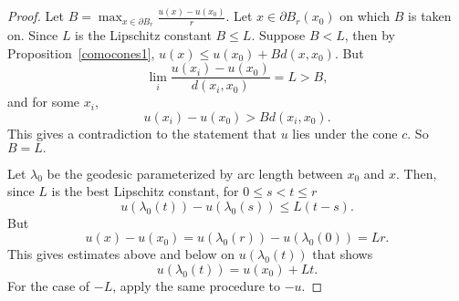 \documentclass{ip-journal}
\theoremstyle{definition}
\numberwithin{equation}{section}
\begin{document}
\begin{proof} Let $B = \max_{x \in \partial B_r} \frac{u(x)- u(x_0)}{r}.$  Let $x \in \partial B_r(x_0)$ on which $B$ is taken on.  Since $L$ is the  Lipschitz constant $B \leq L.$
Suppose $B < L$, then  by Proposition~\ref{comocones1}, $u (x) \leq u(x_0) +Bd(x,x_0)$. But 
\[
\lim_i \frac{u(x_i) - u(x_0)}{d(x_i,x_0)} = L > B,
\] 
and for some $x_i$,
\[ 
u(x_i) - u(x_0) > Bd(x_i,x_0).
\] 
This gives a contradiction to the statement that $u$ lies under the cone $c$. So $B = L.$

Let $\lambda_0$ be the geodesic parameterized by arc length between $x_0$ and $x$.  Then,  since $L$ is the best Lipschitz constant, for $0 \leq s < t \leq r$
\[
 u(\lambda_0(t)) -u(\lambda_0(s)) \leq L(t-s).
 \]
But 
\[
u(x)- u(x_0) = u(\lambda_0(r) ) - u(\lambda_0(0)) = Lr. 
\]   
This gives estimates above and below on $u(\lambda_0(t))$ that shows
\[  
u(\lambda_0(t)) = u(x_0) + Lt.
\]
For the case of $-L$, apply the same procedure to $-u$.
\end{proof}
\end{document}
